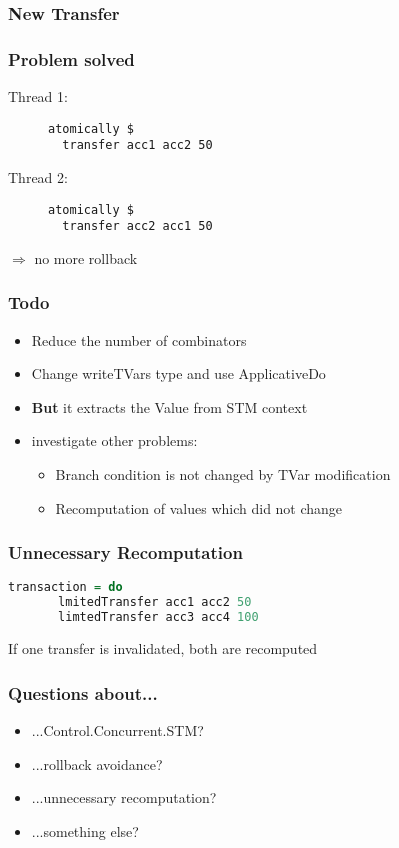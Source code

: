 \documentclass{beamer}
\begin{document}
  
  \begin{frame}[fragile]
    \frametitle{New Transfer}
    
\end{frame}
  
 
  \begin{frame}[fragile]
    \frametitle{Problem solved}
    \fboxsep=0pt
    \noindent
    \begin{minipage}[t]{0.48\linewidth}
      Thread 1:
      \begin{figure}
       \begin{lstlisting}[frame=single]
atomically $ 
  transfer acc1 acc2 50
       \end{lstlisting}
      \end{figure}
    \end{minipage}%
    \hfill%
    \begin{minipage}[t]{0.48\linewidth}
      Thread 2:
      \begin{figure}
       \begin{lstlisting}[frame=single]
atomically $ 
  transfer acc2 acc1 50
       \end{lstlisting}
      \end{figure}
    \end{minipage}
    \vfill
    $\Rightarrow$ no more rollback
\end{frame}
  
  
  \begin{frame}
   \frametitle{Todo}
   \begin{itemize}\setlength\itemsep{1em}
    \item Reduce the number of combinators
    \item Change writeTVars type and use ApplicativeDo
    \item \textbf{But} it extracts the Value from STM context
    \item investigate other problems:
      \begin{itemize}
        \item Branch condition is not changed by TVar modification
        \item Recomputation of values which did not change
      \end{itemize}
   \end{itemize}
  \end{frame}

  \begin{frame}[fragile]
    \frametitle{Unnecessary Recomputation}
    \begin{lstlisting}[language=Haskell]
     transaction = do
       lmitedTransfer acc1 acc2 50
       limtedTransfer acc3 acc4 100
    \end{lstlisting}
    \vfill
    If one transfer is invalidated, both are recomputed
\end{frame}


\begin{frame}
 \frametitle{Questions about...}
 \begin{itemize}\setlength\itemsep{1em}
  \item ...Control.Concurrent.STM?
  \item ...rollback avoidance?
  \item ...unnecessary recomputation?
  \item ...something else?
 \end{itemize}

\end{frame}


  
\end{document}

